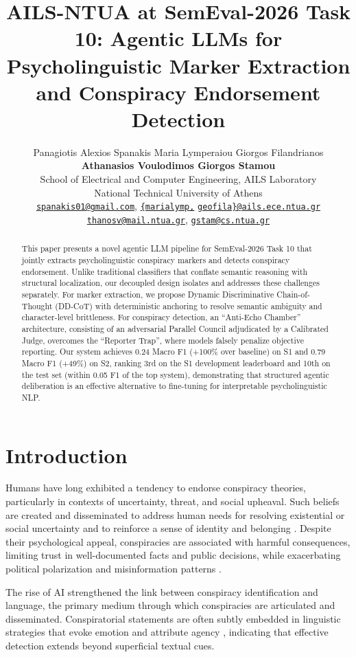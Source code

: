 \documentclass[11pt]{article}
\title{AILS-NTUA at SemEval-2026 Task 10: Agentic LLMs for Psycholinguistic Marker Extraction and Conspiracy Endorsement Detection}
\author{Panagiotis Alexios Spanakis \hspace{0.8em} Maria Lymperaiou \hspace{0.8em} Giorgos Filandrianos \\
\textbf{Athanasios Voulodimos \quad Giorgos Stamou} \\
School of Electrical and Computer Engineering, AILS Laboratory \\
National Technical University of Athens \\
\href{mailto:spanakis01@gmail.com}{\texttt{spanakis01@gmail.com}}, \href{mailto:marialymp@ails.ece.ntua.gr}{\texttt{\{marialymp,}} \href{mailto:geofila@ails.ece.ntua.gr}{\texttt{geofila\}@ails.ece.ntua.gr}} \\
\href{mailto:thanosv@mail.ntua.gr}{\texttt{thanosv@mail.ntua.gr}}, \href{mailto:gstam@cs.ntua.gr}{\texttt{gstam@cs.ntua.gr}}}
\begin{document}
\maketitle

\begin{abstract}
	This paper presents a novel agentic LLM pipeline for SemEval-2026 Task 10 that jointly extracts psycholinguistic conspiracy markers and detects conspiracy endorsement. Unlike traditional classifiers that conflate semantic reasoning with structural localization, our decoupled design isolates and addresses these challenges separately. For marker extraction, we propose Dynamic Discriminative Chain-of-Thought (DD-CoT) with deterministic anchoring to resolve semantic ambiguity and character-level brittleness. For conspiracy detection, an ``Anti-Echo Chamber'' architecture, consisting of an adversarial Parallel Council adjudicated by a Calibrated Judge, overcomes the ``Reporter Trap'', where models falsely penalize objective reporting. Our system achieves 0.24 Macro F1 (+100\% over baseline) on S1 and 0.79 Macro F1 (+49\%) on S2, ranking 3rd on the S1 development leaderboard and 10th on the test set (within 0.05 F1 of the top system), demonstrating that structured agentic deliberation is an effective alternative to fine-tuning for interpretable psycholinguistic NLP.
\end{abstract}


\section{Introduction}
Humans have long exhibited a tendency to endorse conspiracy theories,
particularly in contexts of uncertainty, threat, and social upheaval. Such
beliefs are created and disseminated to address human needs for resolving
existential or social uncertainty and to reinforce a sense of identity and
belonging \cite{psychology-of-conspiracy, belief}. Despite their psychological
appeal, conspiracies are associated with harmful consequences, limiting trust
in well-documented facts and public decisions, while exacerbating political
polarization and misinformation patterns \cite{understanding}.

The rise of AI strengthened the link between conspiracy identification and language, the primary medium through which conspiracies are articulated and disseminated. Conspiratorial statements are often subtly embedded in linguistic strategies that evoke emotion and attribute agency \cite{miani2022loco, rains2023psycholinguistic}, indicating that effective detection extends beyond superficial textual cues.
\end{document}
